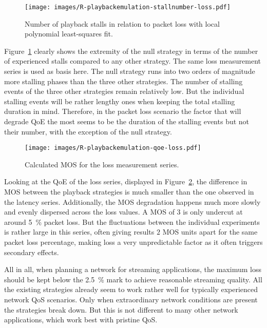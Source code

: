 \begin{figure}[htbp]
	\centering
	\texttt{[image: images/R-playbackemulation-stallnumber-loss.pdf]}
	\caption{Number of playback stalls in relation to packet loss with local polynomial least-squares fit.}
\label{c3:fig:eval-loss-numstalls}
\end{figure}

Figure~\ref{c3:fig:eval-loss-numstalls} clearly shows the extremity of the null strategy in terms of the number of experienced stalls compared to any other strategy. The same loss measurement series is used as basis here. The null strategy runs into two orders of magnitude more stalling phases than the three other strategies. The number of stalling events of the three other strategies remain relatively low. But the individual stalling events will be rather lengthy ones when keeping the total stalling duration in mind. Therefore, in the packet loss scenario the factor that will degrade \gls{QoE} the most seems to be the duration of the stalling events but not their number, with the exception of the null strategy.

\begin{figure}[htb]
	\centering
	\texttt{[image: images/R-playbackemulation-qoe-loss.pdf]}
	\caption{Calculated \acrshort{MOS} for the loss measurement series.}
\label{c3:fig:eval-loss-qoe}
\end{figure}

Looking at the \gls{QoE} of the loss series, displayed in Figure~\ref{c3:fig:eval-loss-qoe}, the difference in \gls{MOS} between the playback strategies is much smaller than the one observed in the latency series. Additionally, the \gls{MOS} degradation happens much more slowly and evenly dispersed across the loss values. A \gls{MOS} of $3$ is only undercut at around \SI{5}{\percent} packet loss. But the fluctuations between the individual experiments is rather large in this series, often giving results $2$ \gls{MOS} units apart for the same packet loss percentage, making loss a very unpredictable factor as it often triggers secondary effects.

All in all, when planning a network for streaming applications, the maximum loss should be kept below the \SI{2.5}{\percent} mark to achieve reasonable streaming quality. All the existing strategies already seem to work rather well for typically experienced network \gls{QoS} scenarios. Only when extraordinary network conditions are present the strategies break down. But this is not different to many other network applications, which work best with pristine \gls{QoS}.





